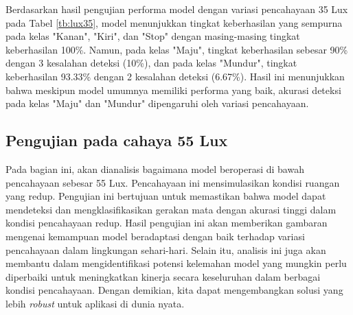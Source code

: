 Berdasarkan hasil pengujian performa model dengan variasi pencahayaan 35 Lux pada Tabel \ref{tb:lux35}, model menunjukkan tingkat keberhasilan yang sempurna pada kelas "Kanan", "Kiri", dan "Stop" dengan masing-masing tingkat keberhasilan 100\%. Namun, pada kelas "Maju", tingkat keberhasilan sebesar 90\% dengan 3 kesalahan deteksi (10\%), dan pada kelas "Mundur", tingkat keberhasilan 93.33\% dengan 2 kesalahan deteksi (6.67\%). Hasil ini menunjukkan bahwa meskipun model umumnya memiliki performa yang baik, akurasi deteksi pada kelas "Maju" dan "Mundur" dipengaruhi oleh variasi pencahayaan.

\subsection{Pengujian pada cahaya 55 Lux}

Pada bagian ini, akan dianalisis bagaimana model beroperasi di bawah pencahayaan sebesar 55 Lux. Pencahayaan ini mensimulasikan kondisi ruangan yang redup. Pengujian ini bertujuan untuk memastikan bahwa model dapat mendeteksi dan mengklasifikasikan gerakan mata dengan akurasi tinggi dalam kondisi pencahayaan redup. Hasil pengujian ini akan memberikan gambaran mengenai kemampuan model beradaptasi dengan baik terhadap variasi pencahayaan dalam lingkungan sehari-hari. Selain itu, analisis ini juga akan membantu dalam mengidentifikasi potensi kelemahan model yang mungkin perlu diperbaiki untuk meningkatkan kinerja secara keseluruhan dalam berbagai kondisi pencahayaan. Dengan demikian, kita dapat mengembangkan solusi yang lebih \emph{robust} untuk aplikasi di dunia nyata.

